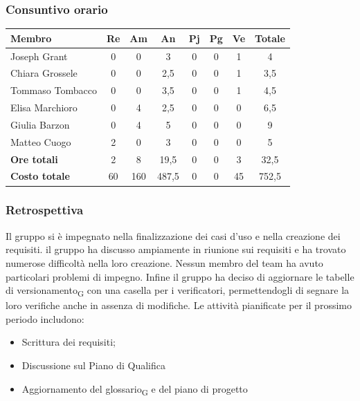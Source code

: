 \documentclass[11pt,a4paper]{article}
\newcommand{\gls}[1]{#1\textsubscript{G}}
\begin{document}
\subsubsection{Consuntivo orario}
\begin{center}
    \begin{tabular}{|l|c|c|c|c|c|c|c|}
        \hline
        \textbf{Membro} & \textbf{Re} & \textbf{Am} & \textbf{An} & \textbf{Pj} & \textbf{Pg} & \textbf{Ve} & \textbf{Totale} \\
        \hline
        Joseph Grant & 0 & 0 & 3 & 0 & 0 & 1 & 4 \\
        \hline
        Chiara Grossele & 0 & 0 & 2,5 & 0 & 0 & 1 & 3,5 \\
        \hline
        Tommaso Tombacco & 0 & 0 & 3,5 & 0 & 0 & 1 & 4,5 \\
        \hline
        Elisa Marchioro & 0 & 4 & 2,5 & 0 & 0 & 0 & 6,5 \\
        \hline
        Giulia Barzon & 0 & 4 & 5 & 0 & 0 & 0 & 9 \\
        \hline
        Matteo Cuogo & 2 & 0 & 3 & 0 & 0 & 0 & 5 \\
        \hline
        \textbf{Ore totali} & 2 & 8 & 19,5 & 0 & 0 & 3 & 32,5 \\
        \hline
        \textbf{Costo totale} & 60 & 160 & 487,5 & 0 & 0 & 45 & 752,5 \\
        \hline
    \end{tabular}
\end{center}

\subsubsection{Retrospettiva}
Il gruppo si è impegnato nella finalizzazione dei casi d'uso e nella creazione dei requisiti. il gruppo ha discusso ampiamente in riunione sui requisiti e ha trovato numerose difficoltà nella loro creazione. Nessun membro del team ha avuto particolari problemi di impegno. Infine il gruppo ha deciso di aggiornare le tabelle di \gls{versionamento} con una casella per i verificatori, permettendogli di segnare la loro verifiche anche in assenza di modifiche.
Le attività pianificate per il prossimo periodo includono:
\begin{itemize}
    \item Scrittura dei requisiti;
    \item Discussione sul Piano di Qualifica
    \item Aggiornamento del \gls{glossario} e del piano di progetto
\end{itemize}
\end{document}
